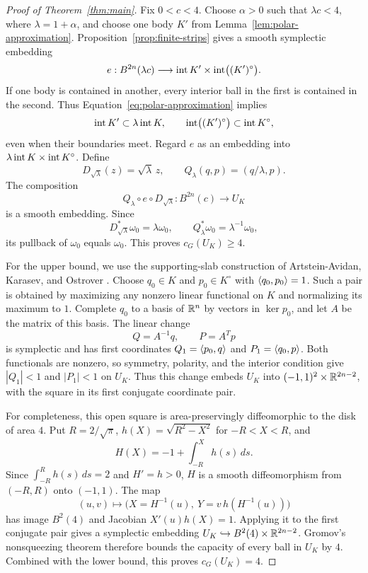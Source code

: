 \begin{proof}[Proof of Theorem~\ref{thm:main}]
Fix $0<c<4$. Choose $\alpha>0$ such that $\lambda c<4$, where
$\lambda=1+\alpha$, and choose one body $K'$ from
Lemma~\ref{lem:polar-approximation}. Proposition~\ref{prop:finite-strips}
gives a smooth symplectic embedding
\[
 e:B^{2n}(\lambda c)\longrightarrow
 \operatorname{int} K'\times\operatorname{int}\bigl((K')^\circ\bigr).
\]
If one body is contained in another, every interior ball in the first
is contained in the second. Thus Equation~\eqref{eq:polar-approximation}
implies
\[
 \operatorname{int} K'\subset\lambda\operatorname{int} K,
 \qquad \operatorname{int}\bigl((K')^\circ\bigr)\subset\operatorname{int} K^\circ,
\]
even when their boundaries meet. Regard $e$ as an embedding into
$\lambda\operatorname{int} K\times\operatorname{int} K^\circ$. Define
\[
 D_{\sqrt\lambda}(z)=\sqrt\lambda\,z,
 \qquad Q_\lambda(q,p)=(q/\lambda,p).
\]
The composition
\begin{equation}\label{eq:general-rescaling}
 Q_\lambda\circ e\circ D_{\sqrt\lambda}:
 B^{2n}(c)\longrightarrow U_K
\end{equation}
is a smooth embedding. Since
\[
 D_{\sqrt\lambda}^*\omega_0=\lambda\omega_0,
 \qquad Q_\lambda^*\omega_0=\lambda^{-1}\omega_0,
\]
its pullback of $\omega_0$ equals $\omega_0$. This proves
$c_G(U_K)\ge4$.

For the upper bound, we use the supporting-slab construction of
Artstein-Avidan, Karasev, and Ostrover
\cite[Remark~4.2]{AAKO2014}. Choose $q_0\in K$ and $p_0\in K^\circ$
with $\langle q_0,p_0\rangle=1$. Such a pair is obtained by maximizing any
nonzero linear functional on $K$ and normalizing its maximum to $1$.
Complete $q_0$ to a basis of $\mathbb R^n$ by vectors in $\ker p_0$, and let
$A$ be the matrix of this basis. The linear change
\[
 Q=A^{-1}q,\qquad P=A^Tp
\]
is symplectic and has first coordinates
$Q_1=\langle p_0,q\rangle$ and $P_1=\langle q_0,p\rangle$.
Both functionals are nonzero, so symmetry, polarity, and the interior
condition give $|Q_1|<1$ and $|P_1|<1$ on $U_K$.
Thus this change embeds $U_K$ into
$(-1,1)^2\times\mathbb R^{2n-2}$, with the square in its first conjugate
coordinate pair.

For completeness, this open square is area-preservingly diffeomorphic
to the disk of area $4$. Put $R=2/\sqrt\pi$,
$h(X)=\sqrt{R^2-X^2}$ for $-R<X<R$, and
\[
 H(X)=-1+\int_{-R}^{X}h(s)\,ds.
\]
Since $\int_{-R}^{R}h(s)\,ds=2$ and $H'=h>0$,
$H$ is a smooth diffeomorphism from $(-R,R)$ onto $(-1,1)$.
The map
\[
 (u,v)\longmapsto
 \bigl(X=H^{-1}(u),\ Y=v\,h(H^{-1}(u))\bigr)
\]
has image $B^2(4)$ and Jacobian $X'(u)h(X)=1$.
Applying it to the first conjugate pair gives a symplectic embedding
$U_K\hookrightarrow B^2(4)\times\mathbb R^{2n-2}$.
Gromov's nonsqueezing theorem \cite{Gromov1985} therefore bounds the
capacity of every ball in $U_K$ by $4$. Combined with the lower bound,
this proves $c_G(U_K)=4$.
\end{proof}


